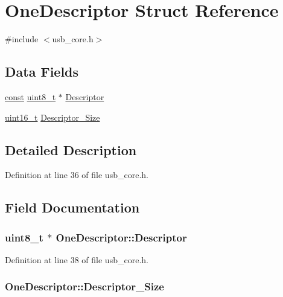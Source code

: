 \hypertarget{struct_one_descriptor}{\section{One\-Descriptor Struct Reference}
\label{struct_one_descriptor}
}


{\ttfamily \#include $<$usb\-\_\-core.\-h$>$}

\subsection*{Data Fields}
\begin{DoxyCompactItemize}
\item 
\hyperlink{group___n_a_m_e_ga7ae6d0e43244213b34de2c2b9aa30da6}{const} \hyperlink{stdint_8h_aba7bc1797add20fe3efdf37ced1182c5}{uint8\-\_\-t} $\ast$ \hyperlink{struct_one_descriptor_a171f7f8eee0febca869eeb527aaef8b1}{Descriptor}
\item 
\hyperlink{stdint_8h_a273cf69d639a59973b6019625df33e30}{uint16\-\_\-t} \hyperlink{struct_one_descriptor_a2e6879330f4a1c6a380849e314df641c}{Descriptor\-\_\-\-Size}
\end{DoxyCompactItemize}


\subsection{Detailed Description}


Definition at line 36 of file usb\-\_\-core.\-h.



\subsection{Field Documentation}
\hypertarget{struct_one_descriptor_a171f7f8eee0febca869eeb527aaef8b1}{
\subsubsection[{Descriptor}]{ {\bf uint8\-\_\-t} $\ast$ One\-Descriptor\-::\-Descriptor}}\label{struct_one_descriptor_a171f7f8eee0febca869eeb527aaef8b1}


Definition at line 38 of file usb\-\_\-core.\-h.

\hypertarget{struct_one_descriptor_a2e6879330f4a1c6a380849e314df641c}{
\subsubsection[{Descriptor\-\_\-\-Size}]{ One\-Descriptor\-::\-Descriptor\-\_\-\-Size}}\label{struct_one_descriptor_a2e6879330f4a1c6a380849e314df641c}


